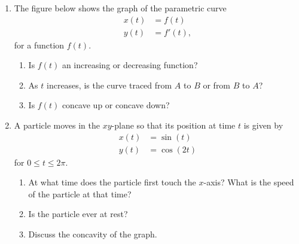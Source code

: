 \documentclass[11pt]{article}
\begin{document}
\begin{enumerate}
\item The figure below shows the graph of the parametric curve
  \begin{align*}
    x(t) &= f(t)\\
    y(t) &= f'(t),
  \end{align*}
  for a function $f(t)$.
    \begin{center}
  \end{center}

  \begin{enumerate}
  \item Is $f(t)$ an increasing or decreasing function?
    \vfill

    \newpage
    
  \item As $t$ increases, is the curve traced from $A$ to $B$ or from
    $B$ to $A$?
    \vfill
  \item Is $f(t)$ concave up or concave down?
    \vfill
  \end{enumerate}

  \newpage

\item A particle moves in the $xy$-plane so that its position at time
  $t$ is given by
  \begin{align*}
    x(t) &= \sin(t)\\
    y(t) &= \cos(2t)
  \end{align*}
  for $0\leq t \leq 2\pi$.
  \begin{enumerate}
  \item At what time does the particle first touch the $x$-axis? What
    is the speed of the particle at that time?
    \vfill
  \item Is the particle ever at rest?
    \vfill
  \item Discuss the concavity of the graph.
    \vfill
  \end{enumerate}


\end{enumerate}
\end{document}
